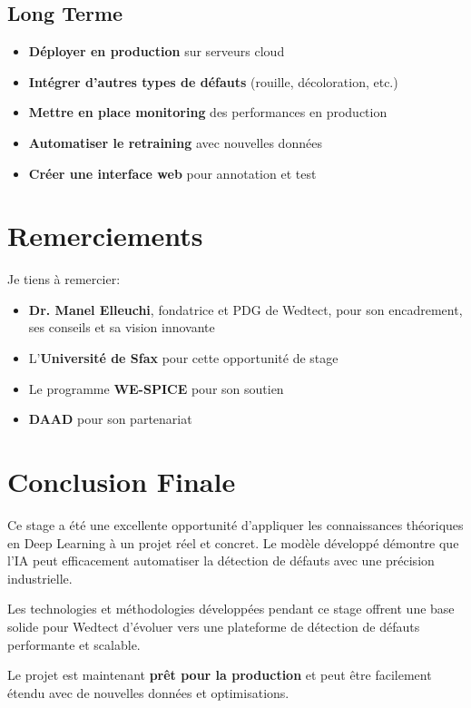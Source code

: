 \documentclass[a4paper,12pt]{report}
\begin{document}
\subsection{Long Terme}

\begin{itemize}
    \item \textbf{Déployer en production} sur serveurs cloud
    \item \textbf{Intégrer d'autres types de défauts} (rouille, décoloration, etc.)
    \item \textbf{Mettre en place monitoring} des performances en production
    \item \textbf{Automatiser le retraining} avec nouvelles données
    \item \textbf{Créer une interface web} pour annotation et test
\end{itemize}

\section{Remerciements}

Je tiens à remercier:

\begin{itemize}
    \item \textbf{Dr. Manel Elleuchi}, fondatrice et PDG de Wedtect, pour son encadrement, ses conseils et sa vision innovante
    \item L'\textbf{Université de Sfax} pour cette opportunité de stage
    \item Le programme \textbf{WE-SPICE} pour son soutien
    \item \textbf{DAAD} pour son partenariat
\end{itemize}

\section{Conclusion Finale}

Ce stage a été une excellente opportunité d'appliquer les connaissances théoriques en Deep Learning à un projet réel et concret. Le modèle développé démontre que l'IA peut efficacement automatiser la détection de défauts avec une précision industrielle.

Les technologies et méthodologies développées pendant ce stage offrent une base solide pour Wedtect d'évoluer vers une plateforme de détection de défauts performante et scalable.

Le projet est maintenant \textbf{prêt pour la production} et peut être facilement étendu avec de nouvelles données et optimisations.
\end{document}

